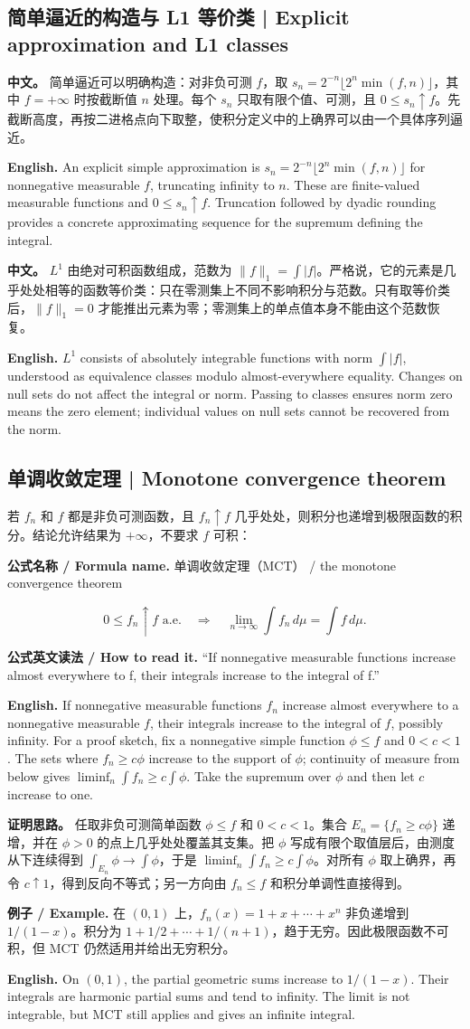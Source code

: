 \documentclass[UTF8,11pt,a4paper]{ctexart}
\newcommand{\EN}[1]{\par\noindent\textbf{English.} #1\par}
\newcommand{\READ}[1]{\par\noindent\textbf{公式英文读法 / How to read it.} #1\par}
\let\APSsubsection\subsection
\renewcommand{\subsection}[1]{\Needspace{6\baselineskip}\APSsubsection{#1}}
\newcommand{\FORMULA}[2]{\par\Needspace{3\baselineskip}\noindent\textbf{公式名称 / Formula name.} #1 / #2\par}
\newcommand{\EX}[2]{\par\noindent\textbf{例子 / Example.} #1\par\EN{#2}}
\newcommand{\APS}[2]{\par\noindent\textbf{中文。} #1\par\noindent\textbf{English.} #2\par\smallskip}
\begin{document}
\subsection{简单逼近的构造与 L1 等价类 | Explicit approximation and L1 classes}
\APS{简单逼近可以明确构造：对非负可测 $f$，取 $s_n=2^{-n}\lfloor2^n\min(f,n)\rfloor$，其中 $f=+\infty$ 时按截断值 $n$ 处理。每个 $s_n$ 只取有限个值、可测，且 $0\le s_n\uparrow f$。先截断高度，再按二进格点向下取整，使积分定义中的上确界可以由一个具体序列逼近。}{An explicit simple approximation is $s_n=2^{-n}\lfloor2^n\min(f,n)\rfloor$ for nonnegative measurable $f$, truncating infinity to $n$. These are finite-valued measurable functions and $0\le s_n\uparrow f$. Truncation followed by dyadic rounding provides a concrete approximating sequence for the supremum defining the integral.}
\APS{$L^1$ 由绝对可积函数组成，范数为 $\|f\|_1=\int|f|$。严格说，它的元素是几乎处处相等的函数等价类：只在零测集上不同不影响积分与范数。只有取等价类后，$\|f\|_1=0$ 才能推出元素为零；零测集上的单点值本身不能由这个范数恢复。}{$L^1$ consists of absolutely integrable functions with norm $\int|f|$, understood as equivalence classes modulo almost-everywhere equality. Changes on null sets do not affect the integral or norm. Passing to classes ensures norm zero means the zero element; individual values on null sets cannot be recovered from the norm.}

\subsection{单调收敛定理 | Monotone convergence theorem}
\noindent 若 $f_n$ 和 $f$ 都是非负可测函数，且 $f_n\uparrow f$ 几乎处处，则积分也递增到极限函数的积分。结论允许结果为 $+\infty$，不要求 $f$ 可积：
\FORMULA{单调收敛定理（MCT）}{the monotone convergence theorem}
\[
0\le f_n\uparrow f\text{ a.e.}
\quad\Longrightarrow\quad
\lim_{n\to\infty}\int f_n\,d\mu=\int f\,d\mu.
\]
\READ{“If nonnegative measurable functions increase almost everywhere to f, their integrals increase to the integral of f.”}
\EN{If nonnegative measurable functions $f_n$ increase almost everywhere to a nonnegative measurable $f$, their integrals increase to the integral of $f$, possibly infinity. For a proof sketch, fix a nonnegative simple function $\phi\le f$ and $0<c<1$. The sets where $f_n\ge c\phi$ increase to the support of $\phi$; continuity of measure from below gives $\liminf_n\int f_n\ge c\int\phi$. Take the supremum over $\phi$ and then let $c$ increase to one.}
\noindent\textbf{证明思路。} 任取非负可测简单函数 $\phi\le f$ 和 $0<c<1$。集合 $E_n=\{f_n\ge c\phi\}$ 递增，并在 $\phi>0$ 的点上几乎处处覆盖其支集。把 $\phi$ 写成有限个取值层后，由测度从下连续得到 $\int_{E_n}\phi\to\int\phi$，于是 $\liminf_n\int f_n\ge c\int\phi$。对所有 $\phi$ 取上确界，再令 $c\uparrow1$，得到反向不等式；另一方向由 $f_n\le f$ 和积分单调性直接得到。
\EX{在 $(0,1)$ 上，$f_n(x)=1+x+\cdots+x^n$ 非负递增到 $1/(1-x)$。积分为 $1+1/2+\cdots+1/(n+1)$，趋于无穷。因此极限函数不可积，但 MCT 仍然适用并给出无穷积分。}{On $(0,1)$, the partial geometric sums increase to $1/(1-x)$. Their integrals are harmonic partial sums and tend to infinity. The limit is not integrable, but MCT still applies and gives an infinite integral.}
\end{document}
